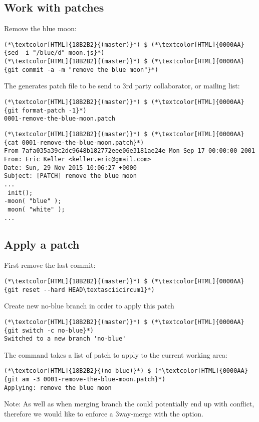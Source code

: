 \subsection{Work with patches}
\begin{frame}[fragile]
    \subslidetitle

  Remove the blue moon:
  \begin{lstlisting}
(*\textcolor[HTML]{18B2B2}{(master)}*) $ (*\textcolor[HTML]{0000AA}{sed -i "/blue/d" moon.js}*)
(*\textcolor[HTML]{18B2B2}{(master)}*) $ (*\textcolor[HTML]{0000AA}{git commit -a -m "remove the blue moon"}*)
\end{lstlisting}

  The  generates patch file to be send to 3rd party collaborator, or mailing list:
  \begin{lstlisting}
(*\textcolor[HTML]{18B2B2}{(master)}*) $ (*\textcolor[HTML]{0000AA}{git format-patch -1}*)
0001-remove-the-blue-moon.patch
\end{lstlisting}

  \begin{lstlisting}
(*\textcolor[HTML]{18B2B2}{(master)}*) $ (*\textcolor[HTML]{0000AA}{cat 0001-remove-the-blue-moon.patch}*)
From 7afa035a39c2dc9648b182772eee06e3181ae24e Mon Sep 17 00:00:00 2001
From: Eric Keller <keller.eric@gmail.com>
Date: Sun, 29 Nov 2015 10:06:27 +0000
Subject: [PATCH] remove the blue moon
...
 init();
-moon( "blue" );
 moon( "white" );
...
\end{lstlisting}

\end{frame}

\subsection{Apply a patch}
\begin{frame}[fragile]
    \subslidetitle
  First remove the last commit:
  \begin{lstlisting}
(*\textcolor[HTML]{18B2B2}{(master)}*) $ (*\textcolor[HTML]{0000AA}{git reset --hard HEAD\textasciicircum1}*)
\end{lstlisting}
  Create new no-blue branch in order to apply this patch
  \begin{lstlisting}
(*\textcolor[HTML]{18B2B2}{(master)}*) $ (*\textcolor[HTML]{0000AA}{git switch -c no-blue}*)
Switched to a new branch 'no-blue'
\end{lstlisting}

  The  command takes a list of patch to apply to the current working area:
  \begin{lstlisting}
(*\textcolor[HTML]{18B2B2}{(no-blue)}*) $ (*\textcolor[HTML]{0000AA}{git am -3 0001-remove-the-blue-moon.patch}*)
Applying: remove the blue moon
\end{lstlisting}

  Note: As well as when merging branch the  could potentially end up with conflict, therefore we would like to enforce a 3way-merge with the  option.

\end{frame}


